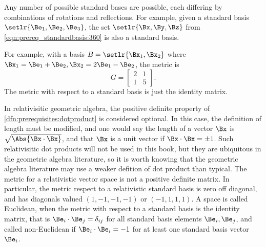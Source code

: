 
Any number of possible standard bases are possible, each differing by combinations of rotations and reflections.  For example, given a standard basis \( \setlr{ \Be_1, \Be_2, \Be_3 } \), the set \( \setlr{\Bx, \By, \Bz} \) from \cref{eqn:prereq_standardbasis:360} is also a standard basis.


For example, with a basis \( B = \setlr{\Bx_1, \Bx_2} \) where \( \Bx_1 = \Be_1 + \Be_2, \Bx_2 = 2 \Be_1 - \Be_2 \), the metric is
\begin{equation}\label{eqn:prereq_standardbasis:400}
G =
\begin{bmatrix}
2 & 1 \\
1 & 5
\end{bmatrix}.
\end{equation}
The metric with respect to a standard basis is just the identity matrix.

In relativisitic geometric algebra, the positive definite property of \cref{dfn:prerequisites:dotproduct} is considered optional.
In this case, the definition of length must be modified, and one would say the length of a vector \( \Bx \) is \( \sqrt{\Abs{\Bx \cdot \Bx}} \), and that \( \Bx \) is a unit vector if \( \Bx \cdot \Bx = \pm 1 \).
Such relativisitic dot products will not be used in this book, but they are ubiquitous in the geometric algebra literature, so
it is worth knowing that the geometric algebra literature may use a weaker defition of dot product than typical.
The metric for a relativistic vector space is not a positive definite matrix.  In particular, the metric respect to a relativistic standard basis is zero off diagonal, and has
diagonals valued \( (1, -1, -1, -1) \) or \( (-1, 1, 1, 1) \).
A space is called Euclidean, when the metric with respect to a standard basis is the identity matrix, that is
\( \Be_i \cdot \Be_j = \delta_{ij} \) for all standard basis elements \( \Be_i, \Be_j \), and
called non-Euclidean if \( \Be_i \cdot \Be_i = -1 \) for at least one standard basis vector \( \Be_i \).

